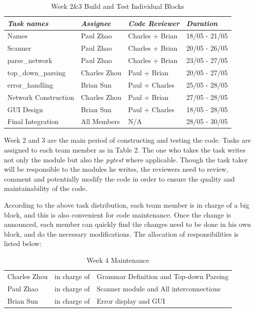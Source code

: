 \documentclass[12pt]{article}
\def\n{\noindent}
\begin{document}
\begin{table}[H]
\begin{tabular}{p{4.5cm}p{3.5cm}p{4cm}p{2.5cm}}
\textit{Task names} & \textit{Assignee} & \textit{Code Reviewer} & \textit{Duration}\\
\hline
Names & Paul Zhao & Charles + Brian & 18/05 - 21/05\\
Scanner & Paul Zhao & Charles + Brian & 20/05 - 26/05\\
parse\_network & Paul Zhao & Charles + Brian & 23/05 - 27/05\\
top\_down\_parsing & Charles Zhou & Paul + Brian & 20/05 - 27/05\\
error\_handling & Brian Sun & Paul + Charles & 25/05 - 28/05\\
Network Construction & Charles Zhou & Paul + Brian & 27/05 - 28/05\\
GUI Design & Brian Sun & Paul + Charles & 18/05 - 28/05\\
Final Integration & All Members & N/A & 28/05 - 30/05\\
\end{tabular}
\caption{Week 2\&3 Build and Test Individual Blocks}
\end{table}

\n Week 2 and 3 are the main period of constructing and testing the code. Tasks are assigned to each team member as in Table 2. The one who takes the task writes not only the module but also the \textit{pytest} where applicable. Though the task taker will be responsible to the modules he writes, the reviewers need to review, comment and potentially modify the code in order to ensure the quality and maintainability of the code. \par
\vspace{0.3cm}

\n According to the above task distribution, each team member is in charge of a big block, and this is also convenient for code maintenance. Once the change is announced, each member can quickly find the changes need to be done in his own block, and do the necessary modifications. The allocation of responsibilities is listed below: 

\begin{table}[H]
\begin{tabular}{p{3cm}p{4cm}p{8cm}}
Charles Zhou & in charge of & Grammar Definition and Top-down Parsing\\
Paul Zhao & in charge of & Scanner module and All interconnections\\
Brian Sun & in charge of & Error display and GUI\\
\end{tabular}
\caption{Week 4 Maintenance}
\end{table}
\end{document}

